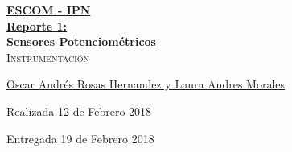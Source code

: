\documentclass[12pt, fleqn]{article}                            %
\author{Oscar Andrés Rosas}                                     %
\theoremstyle{break}                                            %
\begin{document}
\begin{titlepage}
    
    \pagecolor{TitlePageColor}                                      %
    \color{white}                                                   %

    \vspace                                                         %
    \baselineskip                                                   %

    \makebox[0pt][l]{\rule{1.3\textwidth}{3pt}}                     %
    
    \href{https://compilandoconocimiento.com}                       %
    {\textbf{\textsc{\Huge ESCOM - IPN}}}\\[2.7cm]                  %

    \href{\ProjectNameLink/LibroAnalisisDeAlgoritmos}               %
    {\fontsize{35}{40}                                              %
        \selectfont
        \textbf{Reporte 1: \\Sensores Potenciométricos}}\\[0.5cm]   %
    \textcolor{ColorSubtext}                                        %
        {\textsc{\LARGE Instrumentación}}                           %
    
    \vfill                                                          %
    
    \href{\ProjectAuthorLink}                                       %
    {\LARGE 
    \textsf{Oscar Andrés Rosas Hernandez y Laura Andres Morales}}   %

    \vspace                                                         %
    \baselineskip                                                   %
    
    {\large \textsf{Realizada 12 de Febrero 2018}}                  %
    
    {\large \textsf{Entregada 19 de Febrero 2018}}                  %

\end{titlepage}
\end{document}
